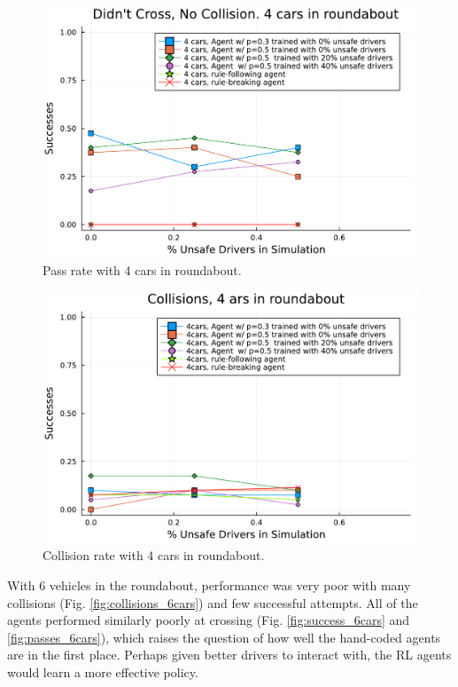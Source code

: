 \documentclass[conference]{IEEEtran}
\begin{document}
\begin{figure}[h]
	\centering
	\includegraphics[width=0.9\linewidth]{figures/passes_3.pdf}
	\caption{Pass rate with 4 cars in roundabout.}
	\label{fig:passes_4cars}
\end{figure}
\begin{figure}[h]
	\centering
	\includegraphics[width=0.9\linewidth]{figures/collisions_3.pdf}
	\caption{Collision rate with 4 cars in roundabout.}
	\label{fig:collisions_4cars}
\end{figure}

With 6 vehicles in the roundabout, performance was very poor with many collisions (Fig. \ref{fig:collisions_6cars}) and few successful attempts. All of the agents performed similarly poorly at crossing (Fig. \ref{fig:success_6cars} and \ref{fig:passes_6cars}), which raises the question of how well the hand-coded agents are in the first place. Perhaps given better drivers to interact with, the RL agents would learn a more effective policy.
\end{document}
